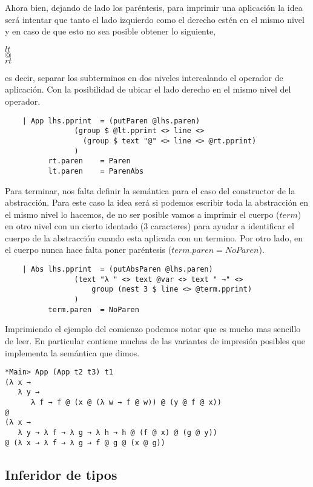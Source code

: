 \documentclass[a4paper,10pt]{article}
\begin{document}
Ahora bien, dejando de lado los paréntesis, para imprimir una aplicación la idea será
intentar que tanto el lado izquierdo como el derecho estén en el mismo nivel y en caso
de que esto no sea posible obtener lo siguiente,

\begin{center}
$lt$\\
$@$\\
$rt$
\end{center}

es decir, separar los subterminos en dos niveles intercalando el operador de aplicación.
Con la posibilidad de ubicar el lado derecho en el mismo nivel del operador.

\begin{lstlisting}    
    | App lhs.pprint  = (putParen @lhs.paren) 
                (group $ @lt.pprint <> line <> 
                  (group $ text "@" <> line <> @rt.pprint)
                )
          rt.paren    = Paren
          lt.paren    = ParenAbs
\end{lstlisting}    

Para terminar, nos falta definir la semántica para el caso del constructor de la
abstracción. Para este caso la idea será si podemos escribir toda la abstracción
en el mismo nivel lo hacemos, de no ser posible vamos a imprimir el cuerpo ($term$)
en otro nivel con un cierto identado (3 caracteres) para ayudar a identificar el
cuerpo de la abstracción cuando esta aplicada con un termino. Por otro lado, en el
cuerpo nunca hace falta poner paréntesis ($term.paren = NoParen$).

\begin{lstlisting}
    | Abs lhs.pprint  = (putAbsParen @lhs.paren)
                (text "λ " <> text @var <> text " →" <> 
                    group (nest 3 $ line <> @term.pprint)
                )
          term.paren  = NoParen
\end{lstlisting}

Imprimiendo el ejemplo del comienzo podemos notar que es mucho mas sencillo de
leer. En particular contiene muchas de las variantes de impresión posibles que
implementa la semántica que dimos.

\begin{verbatim}
*Main> App (App t2 t3) t1
(λ x →
   λ y →
      λ f → f @ (x @ (λ w → f @ w)) @ (y @ f @ x))
@
(λ x →
   λ y → λ f → λ g → λ h → h @ (f @ x) @ (g @ y))
@ (λ x → λ f → λ g → f @ g @ (x @ g))
\end{verbatim}

\subsection{Inferidor de tipos}
\end{document}
